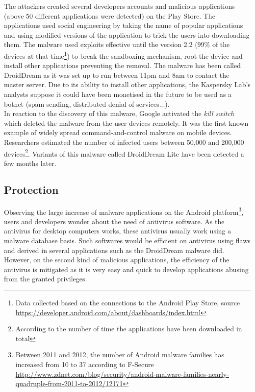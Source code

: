The attackers created several developers accounts and malicious applications (above 50 different applications were detected) on the Play Store.
The applications used social engineering by taking the name of popular applications and using modified versions of the application to trick the users into downloading them.
The malware used exploits effective until the version 2.2 (99\% of the devices at that time\footnote{Data collected based on the connections to the Android Play Store, source \url{https://developer.android.com/about/dashboards/index.html}}) to break the sandboxing mechanism, root the device and install other applications preventing the removal.
The malware has been called DroidDream as it was set up to run between 11pm and 8am to contact the master server.
Due to its ability to install other applications, the Kaspersky Lab's analysts suppose it could have been monetised in the future to be used as a botnet (spam sending, distributed denial of services...).\\

In reaction to the discovery of this malware, Google activated the \emph{kill switch} which deleted the malware from the user devices remotely.
It was the first known example of widely spread command-and-control malware on mobile devices.
Researchers estimated the number of infected users between 50,000 and 200,000 devices\footnote{According to the number of time the applications have been downloaded in total}.
Variants of this malware called DroidDream Lite have been detected a few months later.

\subsection{Protection}
Observing the large increase of malware applications on the Android platform\footnote{Between 2011 and 2012, the number of Android malware families has increased from 10 to 37 according to F-Secure \url{http://www.zdnet.com/blog/security/android-malware-families-nearly-quadruple-from-2011-to-2012/12171}}, users and developers wonder about the need of antivirus software.
As the antivirus for desktop computers works, these antivirus usually work using a malware database basis.
Such softwares would be efficient on antivirus using flaws and derived in several applications such as the DroidDream malware did.
However, on the second kind of malicious applications, the efficiency of the antivirus is mitigated as it is very easy and quick to develop applications abusing from the granted privileges.\\

